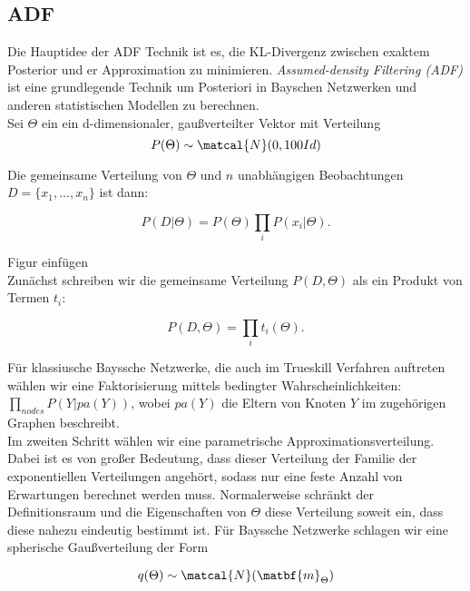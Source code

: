 \documentclass[12pt,a4paper]{scrartcl}
\numberwithin{equation}{section}
\begin{document}
{  \subsection{ADF}
  
  Die Hauptidee der ADF Technik ist es, die KL-Divergenz zwischen exaktem Posterior und er Approximation zu minimieren.
  \textit{Assumed-density Filtering (ADF)} ist eine grundlegende Technik um Posteriori in Bayschen Netzwerken
  und anderen statistischen Modellen zu berechnen. \\
  Sei $\Theta$ ein ein d-dimensionaler, gaußverteilter Vektor mit Verteilung 
  \begin{equation}
   P(\Theta) \sim \matcal{N}(0,100Id)
  \end{equation}
  
  Die gemeinsame Verteilung von $\Theta$ und $n$ unabhängigen Beobachtungen $D = \{x_1,...,x_n\}$ ist dann: 
  
  \begin{equation}
   P(D|\Theta) = P(\Theta) \prod_i P(x_i|\Theta).
  \end{equation}
  
  Figur einfügen \\
  
  Zunächst schreiben wir die gemeinsame Verteilung $P(D, \Theta)$ als ein Produkt von Termen
  $t_i$: 
  
  \begin{equation}
   P(D, \Theta) = \prod_i t_i(\Theta).
  \end{equation}
  
  Für klassiusche Bayssche Netzwerke, die auch im Trueskill Verfahren auftreten wählen wir eine 
  Faktorisierung mittels bedingter Wahrscheinlichkeiten: $\prod_{nodes} P(Y|pa(Y))$, wobei $pa(Y)$
  die Eltern von Knoten $Y$ im zugehörigen Graphen beschreibt. \\
  Im zweiten Schritt wählen wir eine parametrische Approximationsverteilung. Dabei ist es von großer Bedeutung, 
  dass dieser Verteilung der Familie der exponentiellen Verteilungen angehört, sodass nur eine feste Anzahl 
  von Erwartungen berechnet werden muss. 
  Normalerweise schränkt der Definitionsraum und die Eigenschaften von $\Theta$ diese Verteilung soweit ein, dass 
  diese nahezu eindeutig bestimmt ist. 
  Für Bayssche Netzwerke schlagen wir eine spherische Gaußverteilung der Form
  
  \begin{equation}
   q(\Theta) \sim \matcal{N}(\matbf{m}_{\Theta})
  \end{equation}

}
\end{document}
